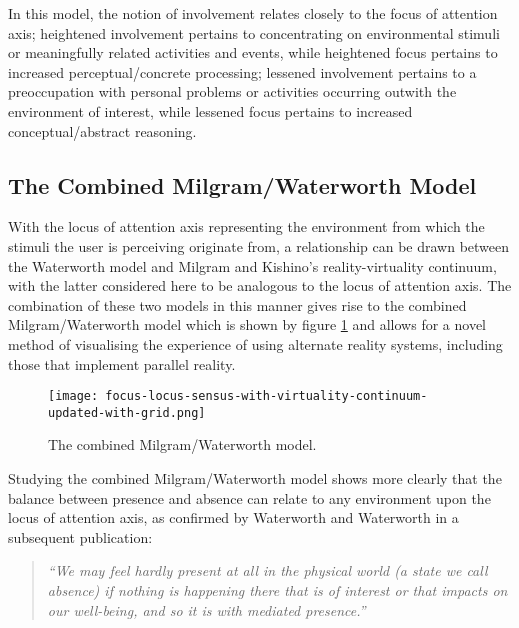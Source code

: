 In this model, the notion of involvement relates closely to the focus of attention axis; heightened involvement pertains to concentrating on environmental stimuli or meaningfully related activities and events, while heightened focus pertains to increased perceptual/concrete processing; lessened involvement pertains to a preoccupation with personal problems or activities occurring outwith the environment of interest, while lessened focus pertains to increased conceptual/abstract reasoning.


\subsection{The Combined Milgram/Waterworth Model}
\label{combined-milgram-waterworth-model}
With the locus of attention axis representing the environment from which the stimuli the user is perceiving originate from, a relationship can be drawn between the Waterworth model and Milgram and Kishino's reality-virtuality continuum, with the latter considered here to be analogous to the locus of attention axis. The combination of these two models in this manner gives rise to the combined Milgram/Waterworth model which is shown by figure \ref{focus-locus-sensus-with-virtuality-continuum} and allows for a novel method of visualising the experience of using alternate reality systems, including those that implement parallel reality.

\begin{figure}[h]
	\begin{center}
		\texttt{[image: focus-locus-sensus-with-virtuality-continuum-updated-with-grid.png]}
		\caption{The combined Milgram/Waterworth model.}
		\label{focus-locus-sensus-with-virtuality-continuum}
	\end{center}	
\end{figure}

Studying the combined Milgram/Waterworth model shows more clearly that the balance between presence and absence can relate to any environment upon the locus of attention axis, as confirmed by Waterworth and Waterworth in a subsequent publication:

\begin{quote}
	\textit{``We may feel hardly present at all in the physical world (a state we call absence) if nothing is happening there that is of interest or that impacts on our well-being, and so it is with mediated presence.''}~\cite{Waterworth2014}
\end{quote}

